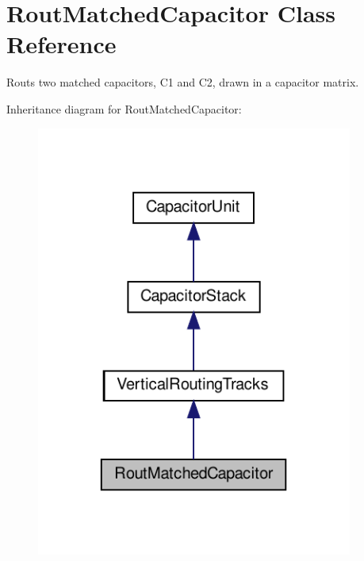 \hypertarget{classpython_1_1capacitorrouted_1_1RoutMatchedCapacitor}{}\section{Rout\+Matched\+Capacitor Class Reference}
\label{classpython_1_1capacitorrouted_1_1RoutMatchedCapacitor}


Routs two matched capacitors, C1 and C2, drawn in a capacitor matrix.  




Inheritance diagram for Rout\+Matched\+Capacitor\+:\nopagebreak
\begin{figure}[H]
\begin{center}
\leavevmode
\includegraphics[width=295pt]{classpython_1_1capacitorrouted_1_1RoutMatchedCapacitor__inherit__graph}
\end{center}
\end{figure}
